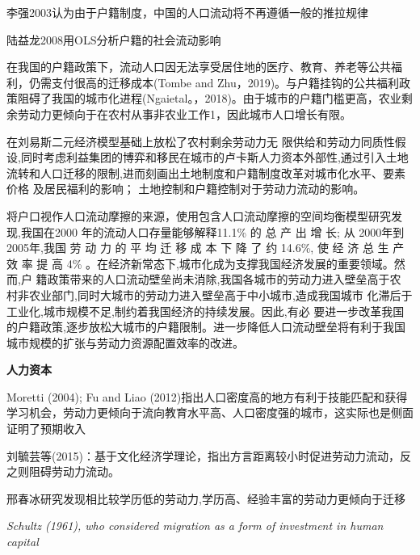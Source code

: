 \documentclass[a4paper,12pt]{article}
\begin{document}
李强2003认为由于户籍制度，中国的人口流动将不再遵循一般的推拉规律

陆益龙2008用OLS分析户籍的社会流动影响

在我国的户籍政策下，流动人口因无法享受居住地的医疗、教育、养老等公共福利，仍需支付很高的迁移成本(Tombe and Zhu，2019)。与户籍挂钩的公共福利政策阻碍了我国的城市化进程(Ngaietal。，2018)。由于城市的户籍门槛更高，农业剩余劳动力更倾向于在农村从事非农业工作1，因此城市人口增长有限。

\cite{ZhouWenTuDiLiuZhuanHuJiZhiDuGaiGeYuZhongGuoChengShiHuaLiLunYuMoNi2017}
在刘易斯二元经济模型基础上放松了农村剩余劳动力无  限供给和劳动力同质性假设,同时考虑利益集团的博弈和移民在城市的卢卡斯人力资本外部性,通过引入土地流转和人口迁移的限制,进而刻画出土地制度和户籍制度改革对城市化水平、要素价格  及居民福利的影响；
土地控制和户籍控制对于劳动力流动的影响。

\cite{WangLiLiWoGuoRenKouQianYiChengBenChengShiGuiMoYuShengChanLu2020}将户口视作人口流动摩擦的来源，使用包含人口流动摩擦的空间均衡模型研究发现,我国在2000 年的流动人口存量能够解释11.1\% 的 总 产 出 增 长; 从  2000年到2005年,我国 劳 动 力 的 平 均 迁 移 成 本 下 降 了 约 14.6\%, 使 经 济 总  生 产 效 率 提 高 4\% 。在经济新常态下,城市化成为支撑我国经济发展的重要领域。然而,户  籍政策带来的人口流动壁垒尚未消除,我国各城市的劳动力进入壁垒高于农  村非农业部门,同时大城市的劳动力进入壁垒高于中小城市,造成我国城市  化滞后于工业化,城市规模不足,制约着我国经济的持续发展。因此,有必  要进一步改革我国的户籍政策,逐步放松大城市的户籍限制。进一步降低人口流动壁垒将有利于我国城市规模的扩张与劳动力资源配置效率的改进。








\textbf{人力资本}

Moretti (2004); Fu and Liao (2012)指出人口密度高的地方有利于技能匹配和获得学习机会，劳动力更倾向于流向教育水平高、人口密度强的城市，这实际也是侧面证明了预期收入

刘毓芸等(2015)\cite{LiuYuYunLaoDongLiKuaFangYanLiuDongDeDaoUXingMoShi2015}：基于文化经济学理论，指出方言距离较小时促进劳动力流动，反之则阻碍劳动力流动。

邢春冰研究发现相比较学历低的劳动力,学历高、经验丰富的劳动力更倾向于迁移

\textit{Schultz (1961), who considered migration as a form of investment in human capital}
\end{document}
